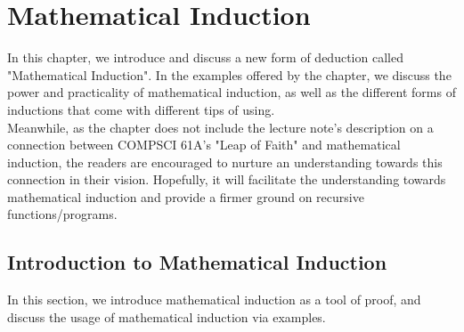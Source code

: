 \chapter{Mathematical Induction}
In this chapter, we introduce and discuss a new form of deduction called "Mathematical Induction". In the examples offered by the chapter, we discuss the power and practicality of mathematical induction, as well as the different forms of inductions that come with different tips of using. \\
Meanwhile, as the chapter does not include the lecture note's description on a connection between COMPSCI 61A's "Leap of Faith" and mathematical induction, the readers are encouraged to nurture an understanding towards this connection in their vision. Hopefully, it will facilitate the understanding towards mathematical induction and provide a firmer ground on recursive functions/programs.

\section{Introduction to Mathematical Induction}
In this section, we introduce mathematical induction as a tool of proof, and discuss the usage of mathematical induction via examples.

